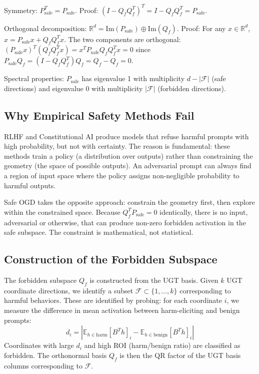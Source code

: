 \documentclass[11pt]{article}
\begin{document}
Symmetry: $P_{\mathrm{safe}}^T = P_{\mathrm{safe}}$. Proof: $(I - Q_f Q_f^T)^T = I - Q_f Q_f^T = P_{\mathrm{safe}}$.

Orthogonal decomposition: $\mathbb{R}^d = \mathrm{Im}(P_{\mathrm{safe}}) \oplus \mathrm{Im}(Q_f)$. Proof: For any $x \in \mathbb{R}^d$, $x = P_{\mathrm{safe}} x + Q_f Q_f^T x$. The two components are orthogonal: $(P_{\mathrm{safe}} x)^T (Q_f Q_f^T x) = x^T P_{\mathrm{safe}} Q_f Q_f^T x = 0$ since $P_{\mathrm{safe}} Q_f = (I - Q_f Q_f^T) Q_f = Q_f - Q_f = 0$.

Spectral properties: $P_{\mathrm{safe}}$ has eigenvalue 1 with multiplicity $d - |\mathcal{F}|$ (safe directions) and eigenvalue 0 with multiplicity $|\mathcal{F}|$ (forbidden directions).

\subsection{Why Empirical Safety Methods Fail}

RLHF and Constitutional AI produce models that refuse harmful prompts with high probability, but not with certainty. The reason is fundamental: these methods train a policy (a distribution over outputs) rather than constraining the geometry (the space of possible outputs). An adversarial prompt can always find a region of input space where the policy assigns non-negligible probability to harmful outputs.

Safe OGD takes the opposite approach: constrain the geometry first, then explore within the constrained space. Because $Q_f^T P_{\mathrm{safe}} = 0$ identically, there is no input, adversarial or otherwise, that can produce non-zero forbidden activation in the safe subspace. The constraint is mathematical, not statistical.

\subsection{Construction of the Forbidden Subspace}

The forbidden subspace $Q_f$ is constructed from the UGT basis. Given $k$ UGT coordinate directions, we identify a subset $\mathcal{F} \subset \{1, \ldots, k\}$ corresponding to harmful behaviors. These are identified by probing: for each coordinate $i$, we measure the difference in mean activation between harm-eliciting and benign prompts:
\begin{equation}
d_i = |\mathbb{E}_{h \in \mathrm{harm}}[B^T h]_i - \mathbb{E}_{h \in \mathrm{benign}}[B^T h]_i|
\end{equation}
Coordinates with large $d_i$ and high ROI (harm/benign ratio) are classified as forbidden. The orthonormal basis $Q_f$ is then the QR factor of the UGT basis columns corresponding to $\mathcal{F}$.
\end{document}
